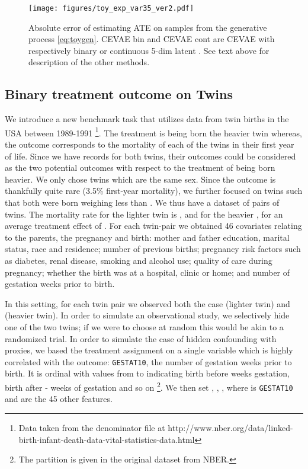 \documentclass{article}
\begin{document}
\begin{figure}[htb]
\centering
\texttt{[image: figures/toy\_exp\_var35\_ver2.pdf]}
\caption{Absolute error of estimating ATE on samples from the generative process \eqref{eq:toygen}. CEVAE bin and CEVAE cont are CEVAE with respectively binary or continuous 5-dim latent . See text above for description of the other methods.}
\label{fig:toy1}
\end{figure}

\subsection{Binary treatment outcome on Twins}
We introduce a new benchmark task that utilizes data from twin births in the USA between 1989-1991 \citep{almond2005costs} \footnote{Data taken from the denominator file at http://www.nber.org/data/linked-birth-infant-death-data-vital-statistics-data.html}. The treatment  is being born the heavier twin whereas, the outcome corresponds to the mortality of each of the twins in their first year of life. Since we have records for both twins, their outcomes could be considered as the two potential outcomes with respect to the treatment of being born heavier. We only chose twins which are the same sex. Since the outcome is thankfully quite rare (3.5\% first-year mortality), we further focused on twins such that both were born weighing less than . We thus have a dataset of  pairs of twins. The mortality rate for the lighter twin is , and for the heavier , for an average treatment effect of . For each twin-pair we obtained 46 covariates relating to the parents, the pregnancy and birth: mother and father education, marital status, race and residence; number of previous births; pregnancy risk factors such as diabetes, renal disease, smoking and alcohol use; quality of care during pregnancy; whether the birth was at a hospital, clinic or home; and number of gestation weeks prior to birth. 

In this setting, for each twin pair we observed both the case  (lighter twin) and  (heavier twin). In order to simulate an observational study, we selectively hide one of the two twins; if we were to choose at random this would be akin to a randomized trial. In order to simulate the case of hidden confounding with proxies, we based the treatment assignment on a single variable which is highly correlated with the outcome: \texttt{GESTAT10}, the number of gestation weeks prior to birth. It is ordinal with values from  to  indicating birth before  weeks gestation, birth after - weeks of gestation and so on \footnote{The partition is given in the original dataset from NBER.}. 
We then set , , , where  is \texttt{GESTAT10} and  are the 45 other features.
\end{document}
